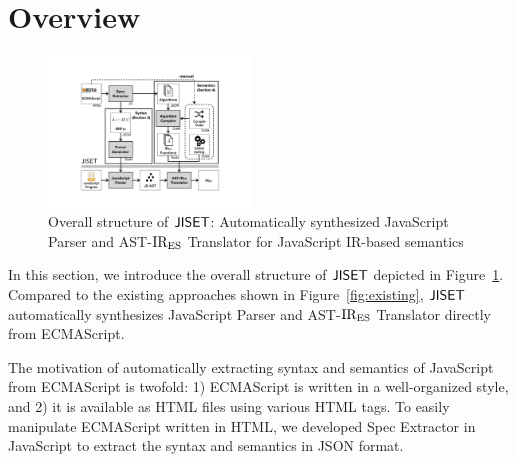 \section{Overview}\label{sec:overview}
\begin{figure}
  \centering
  \includegraphics[width=0.48\textwidth]{img/overview.pdf}
  \caption{Overall structure of \( \text{\sf JISET} \): Automatically synthesized {\sf
    JavaScript Parser} and {\sf AST-\( \text{IR}_\text{ES} \) Translator} for JavaScript
    IR-based semantics}
  \label{fig:overview}
\vspace*{-1em}
\end{figure}

In this section, we introduce the overall structure of \( \text{\sf JISET} \)
depicted in Figure~\ref{fig:overview}.
Compared to the existing approaches shown in
Figure~\ref{fig:existing}, \( \text{\sf JISET} \) automatically synthesizes
{\sf JavaScript Parser} and {\sf AST-\( \text{IR}_\text{ES} \) Translator} directly from
ECMAScript.

The motivation of automatically extracting syntax and semantics of JavaScript
from ECMAScript is twofold: 1) ECMAScript is written in a well-organized
style, and 2) it is available as HTML files using various HTML tags.
To easily manipulate ECMAScript written in HTML, we developed
{\sf Spec Extractor} in JavaScript to extract the syntax and semantics in JSON format.


